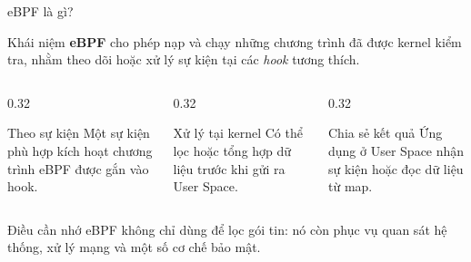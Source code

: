 \begin{frame}{eBPF là gì?}
  \begin{block}{Khái niệm}
    \textbf{eBPF} cho phép nạp và chạy những chương trình đã được kernel kiểm tra,
    nhằm theo dõi hoặc xử lý sự kiện tại các \textit{hook} tương thích.
  \end{block}
  \vspace{0.16cm}
  \begin{columns}[T,onlytextwidth]
    \begin{column}{0.32\textwidth}
      \begin{block}{Theo sự kiện}
        Một sự kiện phù hợp kích hoạt chương trình eBPF được gắn vào hook.
      \end{block}
    \end{column}
    \begin{column}{0.32\textwidth}
      \begin{block}{Xử lý tại kernel}
        Có thể lọc hoặc tổng hợp dữ liệu trước khi gửi ra User Space.
      \end{block}
    \end{column}
    \begin{column}{0.32\textwidth}
      \begin{block}{Chia sẻ kết quả}
        Ứng dụng ở User Space nhận sự kiện hoặc đọc dữ liệu từ map.
      \end{block}
    \end{column}
  \end{columns}
  \vspace{0.16cm}
  \begin{alertblock}{Điều cần nhớ}
    eBPF không chỉ dùng để lọc gói tin: nó còn phục vụ quan sát hệ thống,
    xử lý mạng và một số cơ chế bảo mật.
  \end{alertblock}
\end{frame}
